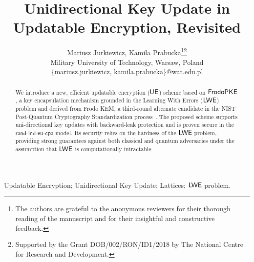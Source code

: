 \documentclass{fundam}
\begin{document}
\title{Unidirectional Key Update in Updatable Encryption, Revisited}

\address{Military University of Technology, Kaliskiego 2 00-908 Warsaw}

\author{Mariusz Jurkiewicz, Kamila Prabucka\thanks{The authors are grateful to the anonymous reviewers for their thorough reading of the manuscript and for their insightful and constructive feedback.}\thanks{Supported by the Grant DOB/002/RON/ID1/2018 by The National Centre for Research and Development.}\\
	Military University of Technology, Warsaw, Poland\\
	\{mariusz.jurkiewicz, kamila.prabucka\}@wat.edu.pl}

\maketitle


\begin{abstract}
	We introduce a new, efficient updatable encryption ($\mathsf{UE}$) scheme based on $\mathsf{FrodoPKE}$, a key encapsulation mechanism grounded in the Learning With Errors ($\mathsf{LWE}$) problem and derived from Frodo KEM, a third-round alternate candidate in the NIST Post-Quantum Cryptography Standardization process~\cite{Frodo,Frodo2}. The proposed scheme supports uni-directional key updates with backward-leak protection and is proven secure in the $\mathsf{rand}$-$\mathsf{ind}$-$\mathsf{eu}$-$\mathsf{cpa}$ model. Its security relies on the hardness of the $\mathsf{LWE}$ problem, providing strong guarantees against both classical and quantum adversaries under the assumption that $\mathsf{LWE}$ is computationally intractable.
\end{abstract}


\begin{keywords}
	Updatable Encryption; Unidirectional Key Update;  Lattices; $\mathsf{LWE}$ problem.
\end{keywords}
\end{document}
